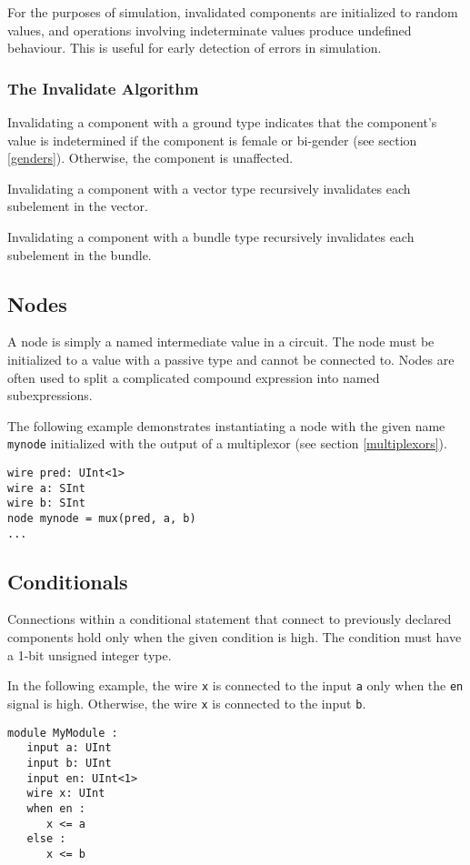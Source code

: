 \documentclass[12pt]{article}
\begin{document}
For the purposes of simulation, invalidated components are initialized to random values, and operations involving indeterminate values produce undefined behaviour. This is useful for early detection of errors in simulation.

\subsubsection{The Invalidate Algorithm}\label{invalidate_algorithm}
Invalidating a component with a ground type indicates that the component's value is indetermined if the component is female or bi-gender (see section \ref{genders}). Otherwise, the component is unaffected.

Invalidating a component with a vector type recursively invalidates each subelement in the vector.

Invalidating a component with a bundle type recursively invalidates each subelement in the bundle.

\subsection{Nodes}
A node is simply a named intermediate value in a circuit. The node must be initialized to a value with a passive type and cannot be connected to. Nodes are often used to split a complicated compound expression into named subexpressions.

The following example demonstrates instantiating a node with the given name \verb|mynode| initialized with the output of a multiplexor (see section \ref{multiplexors}).

\begin{verbatim}
wire pred: UInt<1>
wire a: SInt
wire b: SInt
node mynode = mux(pred, a, b)
...
\end{verbatim}

\subsection{Conditionals}\label{conditionals}
Connections within a conditional statement that connect to previously declared components hold only when the given condition is high. The condition must have a 1-bit unsigned integer type.

In the following example, the wire \verb|x| is connected to the input \verb|a| only when the \verb|en| signal is high. Otherwise, the wire \verb|x| is connected to the input \verb|b|. 

\begin{verbatim}
module MyModule :
   input a: UInt
   input b: UInt
   input en: UInt<1>
   wire x: UInt
   when en :
      x <= a
   else :
      x <= b  
\end{verbatim}
\end{document}
